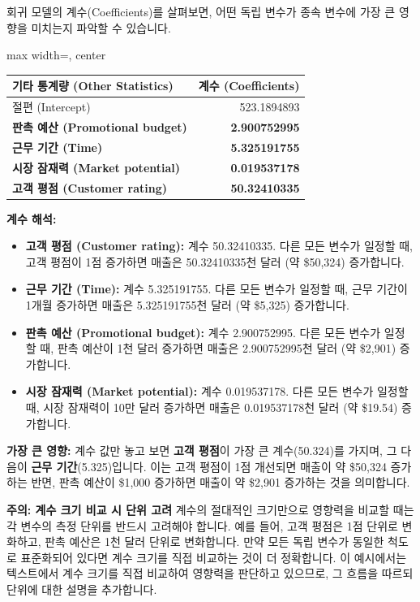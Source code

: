 \documentclass[11pt,a4paper]{book}
\theoremstyle{definition}
\begin{document}
\begin{tcolorbox}[title={\textbf{가장 영향력 있는 변수 식별 (Most Impactful Variables)}}]
회귀 모델의 계수(Coefficients)를 살펴보면, 어떤 독립 변수가 종속 변수에 가장 큰 영향을 미치는지 파악할 수 있습니다.

\begin{adjustbox}{max width=\textwidth, center}
\begin{tabular}{l r}
\toprule
\textbf{기타 통계량 (Other Statistics)} & \textbf{계수 (Coefficients)} \\
\midrule
절편 (Intercept) & 523.1894893 \\
\textbf{판촉 예산 (Promotional budget)} & \textbf{2.900752995} \\
\textbf{근무 기간 (Time)} & \textbf{5.325191755} \\
\textbf{시장 잠재력 (Market potential)} & \textbf{0.019537178} \\
\textbf{고객 평점 (Customer rating)} & \textbf{50.32410335} \\
\bottomrule
\end{tabular}
\end{adjustbox}

\textbf{계수 해석:}
\begin{itemize}
    \item \textbf{고객 평점 (Customer rating):} 계수 50.32410335. 다른 모든 변수가 일정할 때, 고객 평점이 1점 증가하면 매출은 50.32410335천 달러 (약 \$50,324) 증가합니다.
    \item \textbf{근무 기간 (Time):} 계수 5.325191755. 다른 모든 변수가 일정할 때, 근무 기간이 1개월 증가하면 매출은 5.325191755천 달러 (약 \$5,325) 증가합니다.
    \item \textbf{판촉 예산 (Promotional budget):} 계수 2.900752995. 다른 모든 변수가 일정할 때, 판촉 예산이 1천 달러 증가하면 매출은 2.900752995천 달러 (약 \$2,901) 증가합니다.
    \item \textbf{시장 잠재력 (Market potential):} 계수 0.019537178. 다른 모든 변수가 일정할 때, 시장 잠재력이 10만 달러 증가하면 매출은 0.019537178천 달러 (약 \$19.54) 증가합니다.
\end{itemize}

\textbf{가장 큰 영향:}
계수 값만 놓고 보면 \textbf{고객 평점}이 가장 큰 계수(50.324)를 가지며, 그 다음이 \textbf{근무 기간}(5.325)입니다. 이는 고객 평점이 1점 개선되면 매출이 약 \$50,324 증가하는 반면, 판촉 예산이 \$1,000 증가하면 매출이 약 \$2,901 증가하는 것을 의미합니다.

\begin{cautionbox}
\textbf{주의: 계수 크기 비교 시 단위 고려}
계수의 절대적인 크기만으로 영향력을 비교할 때는 각 변수의 측정 단위를 반드시 고려해야 합니다. 예를 들어, 고객 평점은 1점 단위로 변화하고, 판촉 예산은 1천 달러 단위로 변화합니다. 만약 모든 독립 변수가 동일한 척도로 표준화되어 있다면 계수 크기를 직접 비교하는 것이 더 정확합니다. 이 예시에서는 텍스트에서 계수 크기를 직접 비교하여 영향력을 판단하고 있으므로, 그 흐름을 따르되 단위에 대한 설명을 추가합니다.
\end{cautionbox}


\end{tcolorbox}
\end{document}
